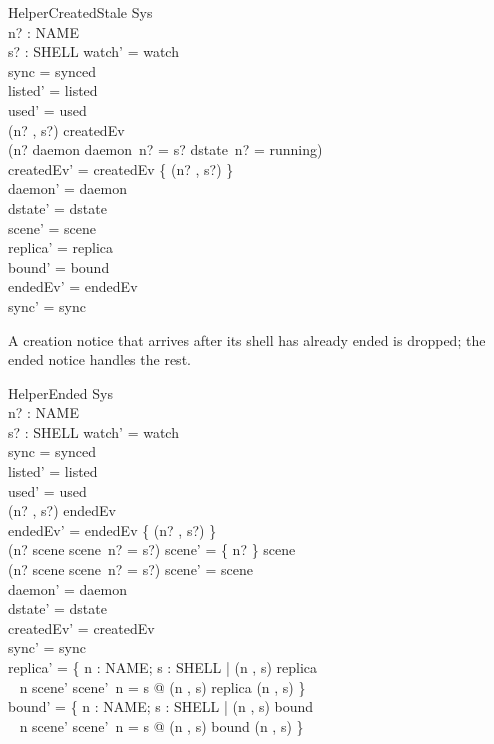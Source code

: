 \documentclass[a4paper,10pt,fleqn]{article}
\begin{document}
\begin{schema}{HelperCreatedStale}
  \Delta Sys \\
  n? : NAME \\
  s? : SHELL
\where
  watch' = watch \\
  sync = synced \\
  listed' = listed \\
  used' = used \\
  (n? , s?) \in createdEv \\
  \lnot (n? \in \dom daemon \land daemon~n? = s?
    \land dstate~n? = running) \\
  createdEv' = createdEv \setminus \{ (n? , s?) \} \\
  daemon' = daemon \\
  dstate' = dstate \\
  scene' = scene \\
  replica' = replica \\
  bound' = bound \\
  endedEv' = endedEv \\
  sync' = sync
\end{schema}

A creation notice that arrives after its shell has already ended is
dropped; the ended notice handles the rest.

\begin{schema}{HelperEnded}
  \Delta Sys \\
  n? : NAME \\
  s? : SHELL
\where
  watch' = watch \\
  sync = synced \\
  listed' = listed \\
  used' = used \\
  (n? , s?) \in endedEv \\
  endedEv' = endedEv \setminus \{ (n? , s?) \} \\
  (n? \in \dom scene \land scene~n? = s?) \implies
    scene' = \{ n? \} \ndres scene \\
  \lnot (n? \in \dom scene \land scene~n? = s?) \implies
    scene' = scene \\
  daemon' = daemon \\
  dstate' = dstate \\
  createdEv' = createdEv \\
  sync' = sync \\
  replica' = \{ n : NAME; s : SHELL | (n , s) \in \dom replica \\
    \quad~ \land n \in \dom scene' \land scene'~n = s @ (n , s) \mapsto replica (n , s) \} \\
  bound' = \{ n : NAME; s : SHELL | (n , s) \in \dom bound \\
    \quad~ \land n \in \dom scene' \land scene'~n = s @ (n , s) \mapsto bound (n , s) \}
\end{schema}
\end{document}
